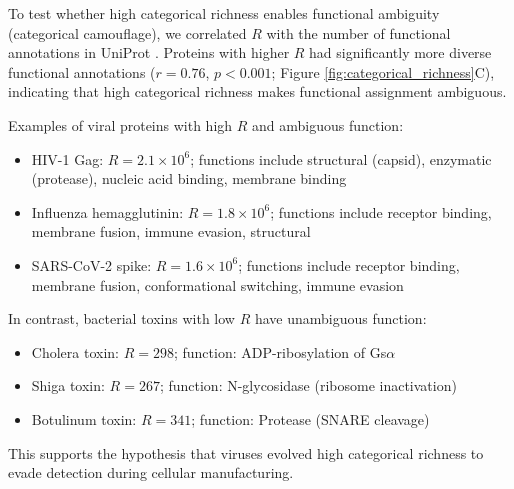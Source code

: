 \documentclass[11pt]{article}
\begin{document}
To test whether high categorical richness enables functional ambiguity (categorical camouflage), we correlated $R$ with the number of functional annotations in UniProt \citep{UniProt2021}. Proteins with higher $R$ had significantly more diverse functional annotations ($r = 0.76$, $p < 0.001$; Figure \ref{fig:categorical_richness}C), indicating that high categorical richness makes functional assignment ambiguous.

Examples of viral proteins with high $R$ and ambiguous function:
\begin{itemize}
\item HIV-1 Gag: $R = 2.1 \times 10^6$; functions include structural (capsid), enzymatic (protease), nucleic acid binding, membrane binding
\item Influenza hemagglutinin: $R = 1.8 \times 10^6$; functions include receptor binding, membrane fusion, immune evasion, structural
\item SARS-CoV-2 spike: $R = 1.6 \times 10^6$; functions include receptor binding, membrane fusion, conformational switching, immune evasion
\end{itemize}

In contrast, bacterial toxins with low $R$ have unambiguous function:
\begin{itemize}
\item Cholera toxin: $R = 298$; function: ADP-ribosylation of Gs$\alpha$
\item Shiga toxin: $R = 267$; function: N-glycosidase (ribosome inactivation)
\item Botulinum toxin: $R = 341$; function: Protease (SNARE cleavage)
\end{itemize}

This supports the hypothesis that viruses evolved high categorical richness to evade detection during cellular manufacturing.
\end{document}
